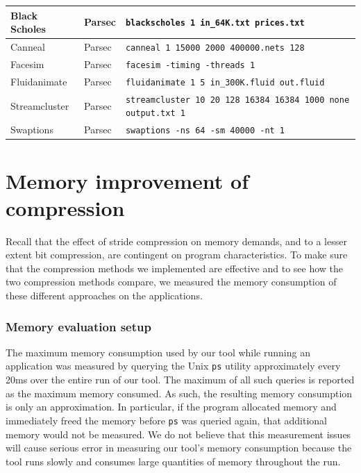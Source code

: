 \documentclass[12pt,twoside]{reedthesis}
\begin{document}
\begin{table}
\begin{tabular}{ |l|l|l| }
				Black Scholes & Parsec  &  \texttt{blackscholes 1 in\_64K.txt prices.txt} \\ \hline
				Canneal & Parsec  &  \texttt{canneal 1 15000 2000 400000.nets 128} \\ \hline
				Facesim & Parsec  &  \texttt{facesim -timing -threads 1} \\ \hline
				Fluidanimate & Parsec  &  \texttt{fluidanimate 1 5 in\_300K.fluid out.fluid} \\ \hline
				Streamcluster & Parsec  &  \texttt{streamcluster 10 20 128 16384 16384 1000 none output.txt 1} \\ \hline
				Swaptions & Parsec  &  \texttt{swaptions -ns 64 -sm 40000 -nt 1} \\ \hline
			\end{tabular}
		\end{table}
		
	\section{Memory improvement of compression}
		
		Recall that the effect of stride compression on memory demands, and to a lesser extent bit compression, are contingent on program characteristics. To make sure that the compression methods we implemented are effective and to see how the two compression methods compare, we measured the memory consumption of these different approaches on the applications. 
		
		\subsubsection{Memory evaluation setup}
		
		The maximum memory consumption used by our tool while running an application was measured by querying the Unix \texttt{ps} utility approximately every 20ms over the entire run of our tool. The maximum of all such queries is reported as the maximum memory consumed. As such, the resulting memory consumption is only an approximation. In particular, if the program allocated memory and immediately freed the memory before \texttt{ps} was queried again, that additional memory would not be measured. We do not believe that this measurement issues will cause serious error in measuring our tool's memory consumption because the tool runs slowly and consumes large quantities of memory throughout the run. %
		
\end{document}
